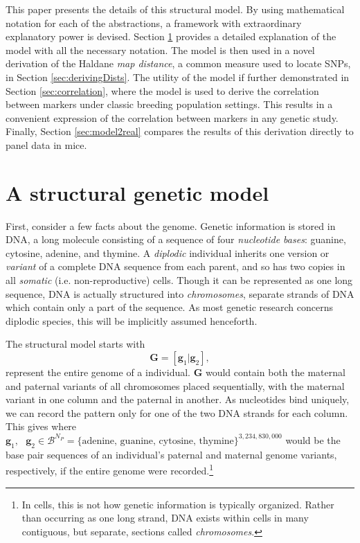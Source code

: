 \documentclass{article}
\newcommand{\ve}[1]{\mathbf{#1}}           %
\newcommand{\m}[1]{\mathbf{#1}}               %
\begin{document}
This paper presents the details of this structural model. By using mathematical notation for each of the abstractions, a framework with extraordinary explanatory power is devised. Section \ref{sec:theModel} provides a detailed explanation of the model with all the necessary notation. The model is then used in a novel derivation of the Haldane \emph{map distance}, a common measure used to locate SNPs, in Section \ref{sec:derivingDists}. The utility of the model if further demonstrated in Section \ref{sec:correlation}, where the model is used to derive the correlation between markers under classic breeding population settings. This results in a convenient expression of the correlation between markers in any genetic study. Finally, Section \ref{sec:model2real} compares the results of this derivation directly to panel data in mice.

\section{A structural genetic model} \label{sec:theModel}

First, consider a few facts about the genome. Genetic information is stored in DNA, a long molecule consisting of a sequence of four \emph{nucleotide bases}: guanine, cytosine, adenine, and thymine. A \emph{diplodic} individual inherits one version or \emph{variant} of a complete DNA sequence from each parent, and so has two copies in all \emph{somatic} (i.e. non-reproductive) cells. Though it can be represented as one long sequence, DNA is actually structured into \emph{chromosomes}, separate strands of DNA which contain only a part of the sequence. As most genetic research concerns diplodic species, this will be implicitly assumed henceforth.


The structural model starts with $$\m{G} = [\ve{g}_1| \ve{g}_2],$$ represent the entire genome of a individual. $\m{G}$ would contain both the maternal and paternal variants of all chromosomes placed sequentially, with the maternal variant in one column and the paternal in another. As nucleotides bind uniquely, we can record the pattern only for one of the two DNA strands for each column. This gives where $\ve{g}_1,\text{ } \ve{g}_2 \in \mathcal{B}^{N_P} = \{\text{adenine, guanine, cytosine, thymine}\}^{3,234,830,000}$ would be the base pair sequences of an individual's paternal and maternal genome variants, respectively, if the entire genome were recorded.\footnote{In cells, this is not how genetic information is typically organized. Rather than occurring as one long strand, DNA exists within cells in many contiguous, but separate, sections called \textit{chromosomes}.}
\end{document}
